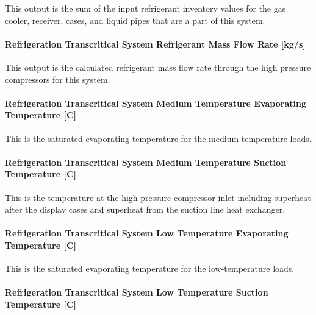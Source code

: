 This output is the sum of the input refrigerant inventory values for the gas cooler, receiver, cases, and liquid pipes that are a part of this system.

\paragraph{Refrigeration Transcritical System Refrigerant Mass Flow Rate {[}kg/s{]}}\label{refrigeration-transcritical-system-refrigerant-mass-flow-rate-kgs}

This output is the calculated refrigerant mass flow rate through the high pressure compressors for this system.

\paragraph{Refrigeration Transcritical System Medium Temperature Evaporating Temperature {[}C{]}}\label{refrigeration-transcritical-system-medium-temperature-evaporating-temperature-c}

This is the saturated evaporating temperature for the medium temperature loads.

\paragraph{Refrigeration Transcritical System Medium Temperature Suction Temperature {[}C{]}}\label{refrigeration-transcritical-system-medium-temperature-suction-temperature-c}

This is the temperature at the high pressure compressor inlet including superheat after the display cases and superheat from the suction line heat exchanger.

\paragraph{Refrigeration Transcritical System Low Temperature Evaporating Temperature {[}C{]}}\label{refrigeration-transcritical-system-low-temperature-evaporating-temperature-c}

This is the saturated evaporating temperature for the low-temperature loads.

\paragraph{Refrigeration Transcritical System Low Temperature Suction Temperature {[}C{]}}\label{refrigeration-transcritical-system-low-temperature-suction-temperature-c}

